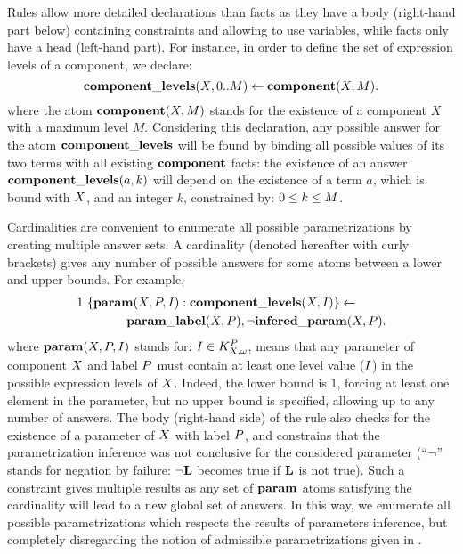 
Rules allow more detailed declarations than facts as they have a body (right-hand part below) containing constraints and allowing to use variables, while facts only have a head (left-hand part).
For instance, in order to define the set of expression levels of a component, we declare:
$$\mathbf{component\_levels}(X, 0..M) \leftarrow \mathbf{component}(X, M).$$
where the atom $\mathbf{component}(X, M)$ stands for the existence of a component $X$ with a maximum level $M$.
Considering this declaration, any possible answer for the atom $\mathbf{component\_levels}$ will be found by binding all possible values of its two terms with all existing $\mathbf{component}$ facts:
the existence of an answer $\mathbf{component\_levels}(a, k)$ will depend on the existence of a term $a$, which is bound with $X$, and an integer $k$, constrained by: $0 \leq k \leq M$.

Cardinalities are convenient to enumerate all possible parametrizations by creating multiple answer sets.
A cardinality (denoted hereafter with curly brackets) gives any number of possible answers for some atoms between a lower and upper bounds.
For example,
\begin{align*}
  & 1\ \{ \mathbf{param}(X, P, I) : \mathbf{component\_levels}(X, I) \} \leftarrow \\
  & \qquad\qquad \mathbf{param\_label}(X, P), \neg \mathbf{infered\_param}(X, P).
\end{align*}
where $\mathbf{param}(X, P, I)$ stands for: $I \in K^P_{X,\omega}$,
means that any parameter of component $X$ and label $P$ must contain at least one level value ($I$) in the possible expression levels of $X$.
Indeed, the lower bound is $1$, forcing at least one element in the parameter, but no upper bound is specified, allowing up to any number of answers.
The body (right-hand side) of the rule also checks for the existence of a parameter of $X$ with label $P$,
and constrains that the parametrization inference was not conclusive for the considered parameter (“$\neg$” stands for negation by failure: $\neg \mathbf{L}$ becomes true if $\mathbf{L}$ is not true).
Such a constraint gives multiple results as any set of $\mathbf{param}$ atoms satisfying the cardinality will lead to a new global set of answers.
In this way, we enumerate all possible parametrizations which respects the results of parameters inference,
but completely disregarding the notion of admissible parametrizations given in .


